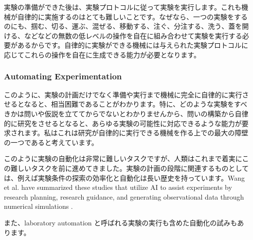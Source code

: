 実験の準備ができた後は、実験プロトコルに従って実験を実行します。これも機械が自律的に実施するのはとても難しいことです。なぜなら、一つの実験をするのにも、掴む、切る、運ぶ、混ぜる、移動する、注ぐ、分注する、洗う、蓋を開ける、などなどの無数の低レベルの操作を自在に組み合わせて実験を実行する必要があるからです。自律的に実験ができる機械には与えられた実験プロトコルに応じてこれらの操作を自在に生成できる能力が必要となります。


\subsubsection{Automating Experimentation}

このように、実験の計画だけでなく準備や実行まで機械に完全に自律的に実行させるとなると、相当困難であることがわかります。特に、どのような実験をすべきかは問いや仮説を立ててからでないとわかりませんから、問いの構築から自律的に研究をさせるとなると、あらゆる実験の可能性に対応できるような能力が要求されます。私はこれは研究が自律的に実行できる機械を作る上での最大の障壁の一つであると考えています。

このように実験の自動化は非常に難しいタスクですが、人類はこれまで着実にこの難しいタスクを前に進めてきました。実験の計画の段階に関連するものとしては、例えば実験条件の探索の効率化と自動化は長い歴史を持っています。Wang et al. have summarized these studies that utilize AI to assist experiments by research planning, research guidance, and generating observational data through numerical simulations \cite{wang2023scientific}. 

また、laboratory automation と呼ばれる実験の実行も含めた自動化の試みもあります。
 
